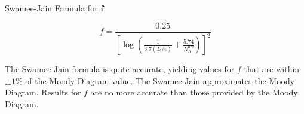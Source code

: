 \documentclass[9pt,xcolor={svgnames, x11names},professionalfonts, mathserif]{beamer}
\begin{document}
                                               \begin{frame}{Swamee-Jain Formula for $\bm f$}

                                                \begin{cmini}[0.8]{
                                                  \begin{mybox}[title=Swamee-Jain Formula for Turbulent Flow]{}{}
                                                    \parb
                                                    \[ f = \frac{0.25}{\left[\log\left(\frac{1}{3.7\left(D/\epsilon\right)}+\frac{5.74}{N_R^{0.9}}\right)\right]^2} \]
                                                    \pars
																									\end{mybox}
                                                   \parb
                                                   The Swamee-Jain formula is quite accurate, yielding values for $f$ that are within $\pm 1\%$ of the Moody Diagram
                                                   value.\parb
																									 The Swamee-Jain approximates the Moody Diagram. Results for $f$ are no more accurate than those provided by the Moody Diagram.
                                                   }\end{cmini}
                                                   \end{frame}


                                                   \begin{frame}
                                                   \end{frame}
\end{document}
